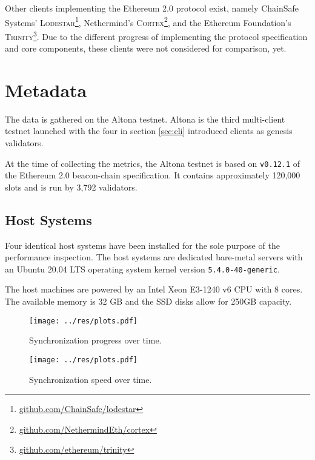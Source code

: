\documentclass[twoside,twocolumn]{article}
\begin{document}
Other clients implementing the Ethereum 2.0 protocol exist, namely ChainSafe Systems' \textsc{Lodestar}\footnote{\href{https://github.com/ChainSafe/lodestar}{github.com/ChainSafe/lodestar}}, Nethermind's \textsc{Cortex}\footnote{\href{https://github.com/NethermindEth/cortex}{github.com/NethermindEth/cortex}}, and the Ethereum Foundation's \textsc{Trinity}\footnote{\href{https://github.com/ethereum/trinity}{github.com/ethereum/trinity}}. Due to the different progress of implementing the protocol specification and core components, these clients were not considered for comparison, yet.\par

\section{Metadata}
The data is gathered on the Altona testnet. Altona is the third multi-client testnet launched with the four in section \ref{sec:cli} introduced clients as genesis validators.\par

At the time of collecting the metrics, the Altona testnet is based on \texttt{v0.12.1} of the Ethereum 2.0 beacon-chain specification. It contains approximately 120,000 slots and is run by 3,792 validators.\par

\subsection{Host Systems}
Four identical host systems have been installed for the sole purpose of the performance inspection. The host systems are dedicated bare-metal servers with an Ubuntu 20.04 LTS operating system kernel version \texttt{5.4.0-40-generic}.\par

The host machines are powered by an Intel Xeon E3-1240 v6 CPU with 8 cores. The available memory is 32 GB and the SSD disks allow for 250GB capacity.\par

\begin{figure}[t]
	\centering
	\texttt{[image: ../res/plots.pdf]}
	\caption{Synchronization progress over time.}
	\label{img:sync:prog}
\end{figure}

\begin{figure}[t]
	\centering
	\texttt{[image: ../res/plots.pdf]}
	\caption{Synchronization speed over time.}
	\label{img:sync:sped}
\end{figure}
\end{document}
